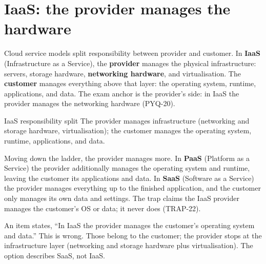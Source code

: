 \section{IaaS: the provider manages the hardware}
Cloud service models split responsibility between provider and customer.
In \textbf{IaaS} (Infrastructure as a Service), the \textbf{provider} manages
the physical infrastructure: servers, storage hardware, \textbf{networking
hardware}, and virtualisation. The \textbf{customer} manages everything above
that layer: the operating system, runtime, applications, and data. The exam
anchor is the provider's side: in IaaS the provider manages the networking
hardware (PYQ-20).

\begin{definitionbox}{IaaS responsibility split}
The provider manages infrastructure (networking and storage hardware,
virtualisation); the customer manages the operating system, runtime,
applications, and data.
\end{definitionbox}

Moving down the ladder, the provider manages more. In \textbf{PaaS}
(Platform as a Service) the provider additionally manages the operating
system and runtime, leaving the customer its applications and data. In
\textbf{SaaS} (Software as a Service) the provider manages everything up to
the finished application, and the customer only manages its own data and
settings. The trap claims the IaaS provider manages the customer's OS or
data; it never does (TRAP-22).

\begin{example}
An item states, ``In IaaS the provider manages the customer's operating
system and data.'' This is wrong. Those belong to the customer; the provider
stops at the infrastructure layer (networking and storage hardware plus
virtualisation). The option describes SaaS, not IaaS.
\end{example}


